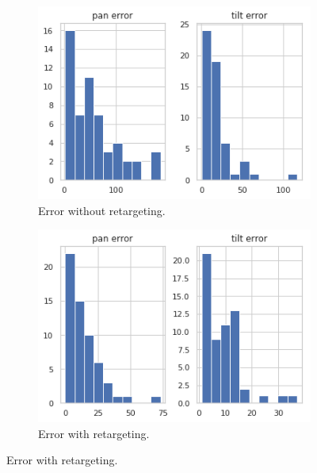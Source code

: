 \documentclass{l4proj}
\begin{document}
\begin{figure}[H]
  \begin{subfigure}[b]{0.5\textwidth}
    \includegraphics[width=\textwidth]{l4template-master/images/without.png}
    \caption{Error without retargeting.}
    \label{errorwithoutretargetting}
  \end{subfigure}
  \begin{subfigure}[b]{0.5\textwidth}
    \includegraphics[width=\textwidth]{l4template-master/images/with_retargetting.png}
    \caption{Error with retargeting.}
    \label{errorwithretargetting}
  \end{subfigure}

    
\end{figure}



\end{document}
